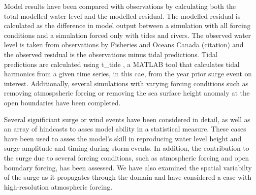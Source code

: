 \documentclass[pdftex,10pt]{article}
\begin{document}
Model results have been compared with observations by calculating both the total modelled water level and the modelled residual. The modelled residual is calculated as the difference in model output between a simulation with all forcing conditions and a simulation forced only with tides and rivers. The observed water level is taken from observations by Fisheries and Oceans Canada (citation) and the observed residual is the observations minus tidal predictions. Tidal predictions are calculated using t\_tide \citep{pawlowicz2002classical}, a MATLAB tool that calculates tidal harmonics from a given time series, in this cae, from the year prior surge event on interest. Additionally, several simulations with varying forcing conditions such as removing atmospsheric forcing or removing the sea surface height anomaly at the open boundaries have been completed. 

Several significiant surge or wind events have been considered in detail, as well as an array of hindcasts to asses model ability in a statistical measure. These cases have been used to asses the model's skill in reproducing water level height and surge amplitude and timing during storm events. In addition, the contribution to the surge due to several forcing conditions, such as atmospheric forcing and open boundary forcing, has been assessed. We have also examined the spatial variabilty of the surge as it propagates through the domain and have considered a case with high-resolution atmospheric forcing. 

\end{document}
